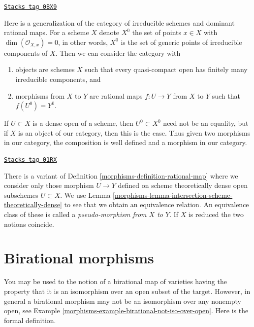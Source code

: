 \begin{remark}
\label{morphisms-remark-generalize-category}
\href{https://stacks.math.columbia.edu/tag/0BX9}{\texttt{Stacks tag 0BX9}}

Here is a generalization of the category of irreducible schemes and
dominant rational maps. For a scheme $X$ denote $X^0$ the set of
points $x \in X$ with $\dim(\mathcal{O}_{X, x}) = 0$, in other words,
$X^0$ is the set of generic points of irreducible components of $X$.
Then we can consider the category with
\begin{enumerate}
\item objects are schemes $X$ such that every quasi-compact open has
finitely many irreducible components, and
\item morphisms from $X$ to $Y$ are rational maps $f : U \to Y$
from $X$ to $Y$ such that $f(U^0) = Y^0$.
\end{enumerate}
If $U \subset X$ is a dense open of a scheme, then
$U^0 \subset X^0$ need not be an equality, but if $X$ is an
object of our category, then this is the case.
Thus given two morphisms in our category, the composition
is well defined and a morphism in our category.
\end{remark}

\begin{remark}
\label{morphisms-remark-pseudo-morphisms}
\href{https://stacks.math.columbia.edu/tag/01RX}{\texttt{Stacks tag 01RX}}

There is a variant of Definition \ref{morphisms-definition-rational-map}
where we consider only those morphism $U \to Y$ defined on
scheme theoretically dense open subschemes $U \subset X$.
We use Lemma \ref{morphisms-lemma-intersection-scheme-theoretically-dense}
to see that we obtain an equivalence relation.
An equivalence class of these is called a
{\it pseudo-morphism from $X$ to $Y$}.
If $X$ is reduced the two notions coincide.
\end{remark}

\section{Birational morphisms}
\label{morphisms-section-birational}
You may be used to the notion of a birational map of varieties
having the property that it is an isomorphism over an open subset
of the target. However, in general a birational morphism may
not be an isomorphism over any nonempty open, see
Example \ref{morphisms-example-birational-not-iso-over-open}.
Here is the formal definition.

